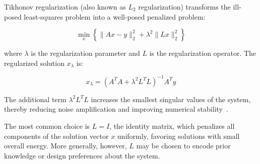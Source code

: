 Tikhonov regularization (also known as $L_2$ regularization) transforms the ill-posed least-squares problem into a well-posed penalized problem:


$$\min_{x} \left\{ \|Ax - y\|_2^2 + \lambda^2 \|L x\|_2^2 \right\}$$

where $\lambda$ is the regularization parameter and $L$ is the regularization operator.
The regularized solution $x_{\lambda}$ is:


$$x_{\lambda} = (A^T A + \lambda^2 L^T L)^{-1}A^T y$$


The additional term $\lambda^2 L^TL$ increases the smallest singular values of the system, thereby reducing noise amplification and improving numerical stability~\cite{golub-2013, mueller-2012, vara-kumar-2022}.

The most common choice is $L = I$, the identity matrix, which penalizes all components of the solution vector $x$ uniformly, favoring solutions with small overall energy. More generally, however, $L$ may be chosen to encode prior knowledge or design preferences about the system.